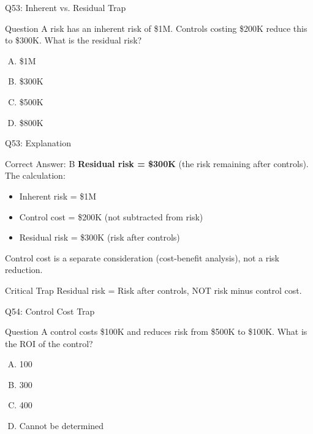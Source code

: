 \documentclass{beamer}
\begin{document}
	\begin{frame}{Q53: Inherent vs. Residual Trap}
		\begin{block}{Question}
			A risk has an inherent risk of \$1M. Controls costing \$200K reduce this to \$300K. What is the residual risk?
		\end{block}
		\begin{enumerate}[(A)]
			\item \$1M
			\item \$300K
			\item \$500K
			\item \$800K
		\end{enumerate}
	\end{frame}
	
	\begin{frame}{Q53: Explanation}
		\begin{block}{Correct Answer: B}
			\textbf{Residual risk = \$300K} (the risk remaining after controls). The calculation:
			\begin{itemize}
				\item Inherent risk = \$1M
				\item Control cost = \$200K (not subtracted from risk)
				\item Residual risk = \$300K (risk after controls)
			\end{itemize}
			Control cost is a separate consideration (cost-benefit analysis), not a risk reduction.
		\end{block}
		\begin{alertblock}{Critical Trap}
			Residual risk = Risk after controls, NOT risk minus control cost.
		\end{alertblock}
	\end{frame}
	
	\begin{frame}{Q54: Control Cost Trap}
		\begin{block}{Question}
			A control costs \$100K and reduces risk from \$500K to \$100K. What is the ROI of the control?
		\end{block}
		\begin{enumerate}[(A)]
			\item 100%
			\item 300%
			\item 400%
			\item Cannot be determined
		\end{enumerate}
	\end{frame}
	
\end{document}
